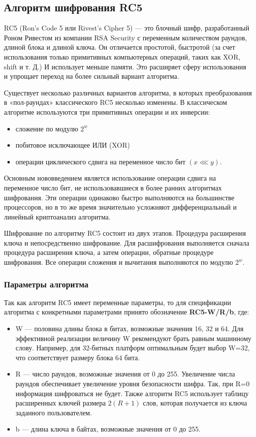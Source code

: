 \documentclass[a4paper]{report}
\begin{document}
\subsection{Алгоритм шифрования RC5}
RC5 (Ron’s Code 5 или Rivest’s Cipher 5) — это блочный шифр, разработанный Роном Ривестом из компании RSA Security с переменным количеством раундов, длиной блока и длиной ключа.
Он отличается простотой, быстротой (за счет использования только примитивных компьютерных операций, таких как XOR, shift и т. Д.) И использует меньше памяти.
Это расширяет сферу использования и упрощает переход на более сильный вариант алгоритма. 



Существует несколько различных вариантов алгоритма, в которых преобразования в «пол-раундах» классического RC5 несколько изменены. В классическом алгоритме используются три примитивных операции и их инверсии:
\begin{itemize}

\item сложение по модулю $\displaystyle 2^{w}$
\item побитовое исключающее ИЛИ (XOR)
\item операции циклического сдвига на переменное число бит $(x \lll y).$
\end{itemize}

Основным нововведением является использование операции сдвига на переменное число бит, не использовавшиеся в более ранних алгоритмах шифрования. Эти операции одинаково быстро выполняются на большинстве процессоров, но в то же время значительно усложняют дифференциальный и линейный криптоанализ алгоритма.

Шифрование по алгоритму RC5 состоит из двух этапов. Процедура расширения ключа и непосредственно шифрование. Для расшифрования выполняется сначала процедура расширения ключа, а затем операции, обратные процедуре шифрования. Все операции сложения и вычитания выполняются по модулю $\displaystyle 2^{w}$. 

\subsubsection{Параметры алгоритма}
Так как алгоритм RC5 имеет переменные параметры, то для спецификации алгоритма с конкретными параметрами принято обозначение \textbf{RC5-W/R/b}, где:
\begin{itemize}
\item W — половина длины блока в битах, возможные значения 16, 32 и 64. Для эффективной реализации величину W рекомендуют брать равным машинному слову. Например, для 32-битных платформ оптимальным будет выбор W=32, что соответствует размеру блока 64 бита.
\item R — число раундов, возможные значения от 0 до 255. Увеличение числа раундов обеспечивает увеличение уровня безопасности шифра. Так, при R=0 информация шифроваться не будет. Также алгоритм RC5 использует таблицу расширенных ключей размера $\displaystyle 2(R+1)$ слов, которая получается из ключа заданного пользователем.
\item b — длина ключа в байтах, возможные значения от 0 до 255.
\end{itemize} 
\end{document}

